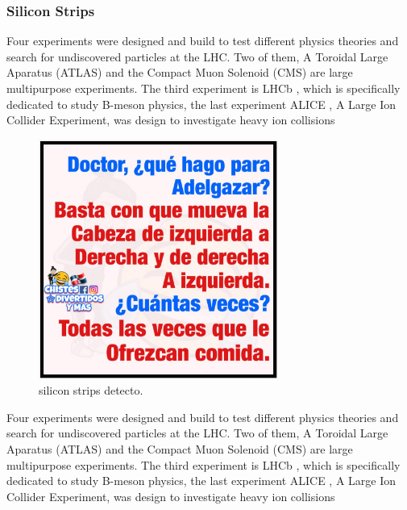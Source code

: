 \subsubsection{Silicon Strips}
Four experiments were designed and build to test different physics theories and search for undiscovered particles at the LHC. Two of them, A Toroidal Large Aparatus (ATLAS)\cite{atlas} and the Compact Muon Solenoid (CMS)\cite{cms_doc} are large multipurpose experiments. The third experiment is LHCb \cite{lhcb}, which is specifically dedicated to study B-meson physics, the last experiment ALICE \cite{alice}, A Large Ion Collider Experiment, was design to investigate heavy ion collisions
\begin{figure}[!h]
  \centering
  \includegraphics[width=0.7\textwidth]{../images/ch2/6}
  \caption[silicon strips detector]{silicon strips detecto.}\label{fig:cms_layout}
\end{figure}
Four experiments were designed and build to test different physics theories and search for undiscovered particles at the LHC. Two of them, A Toroidal Large Aparatus (ATLAS)\cite{atlas} and the Compact Muon Solenoid (CMS)\cite{cms_doc} are large multipurpose experiments. The third experiment is LHCb \cite{lhcb}, which is specifically dedicated to study B-meson physics, the last experiment ALICE \cite{alice}, A Large Ion Collider Experiment, was design to investigate heavy ion collisions
